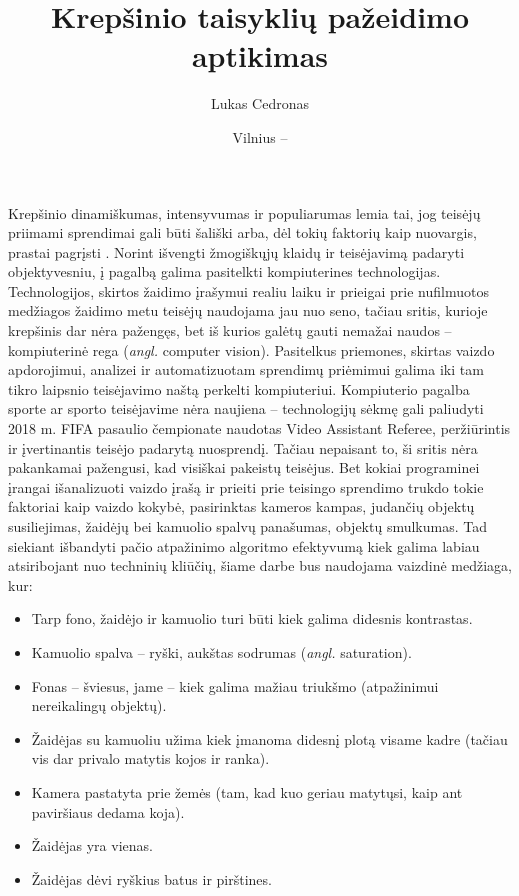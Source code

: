\documentclass{VUMIFPSkursinis}
\title{Krepšinio taisyklių pažeidimo aptikimas}
\author{Lukas Cedronas}
\date{Vilnius – \the\year}
\begin{document}
\maketitle

\tableofcontents

Krepšinio dinamiškumas, intensyvumas ir populiarumas lemia tai, jog teisėjų priimami sprendimai gali būti šališki \cite{ProfitableBias} arba, dėl tokių faktorių kaip nuovargis, prastai pagrįsti \cite{MissedCalls}. Norint išvengti žmogiškųjų klaidų ir teisėjavimą padaryti objektyvesniu, į pagalbą galima pasitelkti kompiuterines technologijas. Technologijos, skirtos žaidimo įrašymui realiu laiku ir prieigai prie nufilmuotos medžiagos žaidimo metu teisėjų naudojama jau nuo seno, tačiau sritis, kurioje krepšinis dar nėra pažengęs, bet iš kurios galėtų gauti nemažai naudos – kompiuterinė rega (\textit{angl.} computer vision). Pasitelkus priemones, skirtas vaizdo apdorojimui, analizei ir automatizuotam sprendimų priėmimui galima iki tam tikro laipsnio teisėjavimo naštą perkelti kompiuteriui. Kompiuterio pagalba sporte ar sporto teisėjavime nėra naujiena – technologijų sėkmę gali paliudyti  2018 m. FIFA pasaulio čempionate naudotas Video Assistant Referee, peržiūrintis ir įvertinantis teisėjo padarytą nuosprendį. Tačiau nepaisant to, ši sritis nėra pakankamai pažengusi, kad visiškai pakeistų teisėjus. Bet kokiai programinei įrangai išanalizuoti vaizdo įrašą ir prieiti prie teisingo sprendimo trukdo tokie faktoriai kaip vaizdo kokybė, pasirinktas kameros kampas, judančių objektų susiliejimas, žaidėjų bei kamuolio spalvų panašumas, objektų smulkumas. Tad siekiant išbandyti pačio atpažinimo algoritmo efektyvumą kiek galima labiau atsiribojant nuo techninių kliūčių, šiame darbe bus naudojama vaizdinė medžiaga, kur:
\begin{itemize}
 \item Tarp fono, žaidėjo ir kamuolio turi būti kiek galima didesnis kontrastas.
 \item Kamuolio spalva – ryški, aukštas sodrumas (\textit{angl.} saturation).
 \item Fonas – šviesus, jame – kiek galima mažiau triukšmo (atpažinimui nereikalingų objektų).
 \item Žaidėjas su kamuoliu užima kiek įmanoma didesnį plotą visame kadre (tačiau vis dar privalo matytis kojos ir ranka).
 \item Kamera pastatyta prie žemės (tam, kad kuo geriau matytųsi, kaip ant paviršiaus dedama koja).
 \item Žaidėjas yra vienas.
 \item Žaidėjas dėvi ryškius batus ir pirštines.
\end{itemize}
\end{document}

